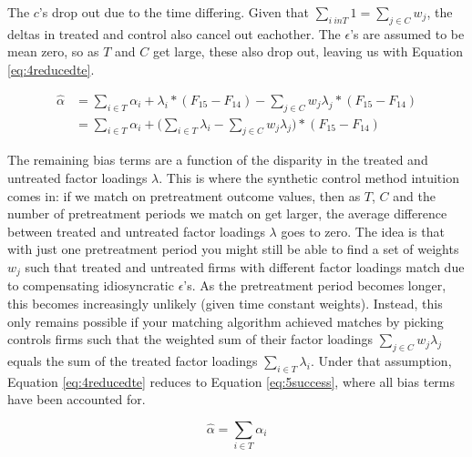 The $c$'s drop out due to the time differing. Given that $\sum_{i \ in T}1 = \sum_{j \in C} w_j$, the deltas in treated and control also cancel out eachother. The $\epsilon$'s are assumed to be mean zero, so as $T$ and $C$ get large, these also drop out, leaving us with Equation \ref{eq:4reducedte}.

\begin{align}\label{eq:4reducedte}
         \hat{\alpha} &=\sum_{i \in T} \alpha_i + \lambda_i * (F_{15} - F_{14}) 
         - \sum_{j \in C} w_j \lambda_j * (F_{15} - F_{14}) \nonumber\\
                     &=\sum_{i \in T} \alpha_i + \bigg(\sum_{i \in T}\lambda_i - \sum_{j \in C} w_j \lambda_j\bigg) * (F_{15} - F_{14})
\end{align}

The remaining bias terms are a function of the disparity in the treated and untreated factor loadings $\lambda$. This is where the synthetic control method intuition comes in: if we match on pretreatment outcome values, then as $T$, $C$ and the number of pretreatment periods we match on get larger, the average difference between treated and untreated factor loadings $\lambda$ goes to zero. The idea is that with just one pretreatment period you might still be able to find a set of weights $w_j$ such that treated and untreated firms with different factor loadings match due to compensating idiosyncratic $\epsilon$'s. As the pretreatment period becomes longer, this becomes increasingly unlikely (given time constant weights). Instead, this only remains possible if your matching algorithm achieved matches by picking controls firms such that the weighted sum of their factor loadings $\sum_{j \in C} w_j \lambda_j$ equals the sum of the treated factor loadings $\sum_{i \in T}\lambda_i$. Under that assumption, Equation \ref{eq:4reducedte} reduces to Equation \ref{eq:5success}, where all bias terms have been accounted for.

\begin{equation}\label{eq:5success}
    \hat{\alpha} = \sum_{i \in T}\alpha_i
\end{equation}


